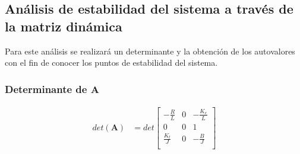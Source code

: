 
\subsection{Análisis de estabilidad del sistema a través de la matriz dinámica}
Para este análisis se realizará un determinante y la
obtención de los autovalores con el fin de conocer los puntos de estabilidad
del sistema.

\subsubsection{Determinante de $\mathbf{A}$}

\begin{align*}
  det\left(\mathbf{A}\right) &=
  det\begin{bmatrix}
  -\frac{R}{L}          & 0        & -\frac{K_e}{L}   \\
  0                     & 0        &  1               \\
  \frac{K_t}{J}         & 0        & -\frac{B}{J}     \\
  \end{bmatrix} \\
\end{align*}
